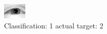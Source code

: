 \begin{figure}[h!]
\begin{center}
\includegraphics[width=0.60\columnwidth]{figures/ID2322_class_1_target_2.png}
\end{center}
\caption{ Classification: 1 actual target: 2}
\label{fig:ID2322_class_1_target_2}
\end{figure}
